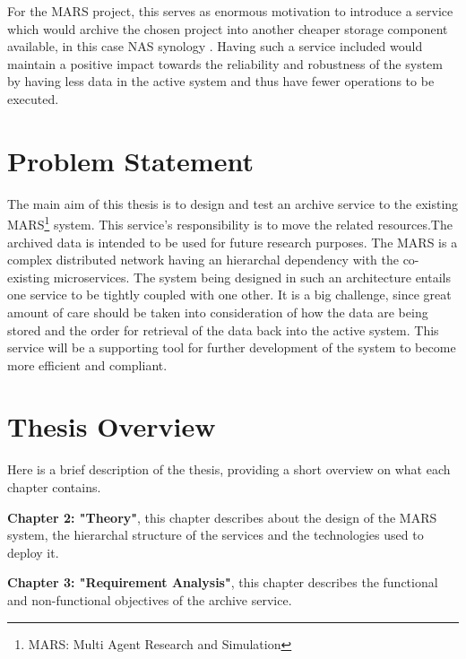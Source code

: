             For the MARS project, this serves as enormous
            motivation to introduce a service which would archive the chosen project
            into another cheaper storage component available, in this case NAS synology 
            \cite{Synology}. Having such a service included would maintain a positive impact 
            towards the reliability and robustness of the system by having less data in the 
            active system and thus have fewer operations to be executed.
 

    \newpage        
    \section{Problem Statement}

        The main aim of this thesis is to design and test an archive service
        to the existing MARS\footnote{MARS: Multi Agent Research and Simulation} system. This service's responsibility is to move the related resources.The archived data is intended 
        to be used for future research purposes.
        The MARS is a complex distributed network having an
        hierarchal dependency with the co-existing microservices. The system being designed
        in such an architecture entails one service to be tightly coupled with one other. It is 
        a big challenge, since great amount of care should be taken into consideration of how the 
        data are being stored and the order for retrieval of the data back into the active system.
        This service will be a supporting tool for further development of the system to become more 
        efficient and compliant. 
         
    
    


    

    \section{Thesis Overview}
        Here is a brief description of the thesis, providing a short overview on what each
        chapter contains.
        
        \par
        \textbf{Chapter 2: "Theory"}, this chapter describes about the design
        of the MARS system, the hierarchal structure of the services and the technologies used to
        deploy it.

        \par
        \textbf{Chapter 3: "Requirement Analysis"}, this chapter describes the functional and
        non-functional objectives of the archive service.

